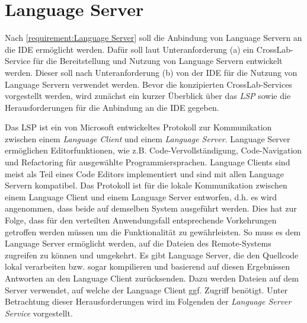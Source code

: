 \section{Language Server}\label{section:konzeption:language-server}

Nach \autoref{requirement:Language Server} soll die Anbindung von Language Servern an die IDE ermöglicht werden. Dafür soll laut Unteranforderung (a) ein CrossLab-Service für die Bereitstellung und Nutzung von Language Servern entwickelt werden. Dieser soll nach Unteranforderung (b) von der IDE für die Nutzung von Language Servern verwendet werden. Bevor die konzipierten CrossLab-Services vorgestellt werden, wird zunächst ein kurzer Überblick über das \textit{\ac{LSP}} \cite{noauthor_language-server-protocol_nodate} sowie die Herausforderungen für die Anbindung an die IDE gegeben.

Das \acl{LSP} ist ein von Microsoft \cite{noauthor_microsoft_nodate} entwickeltes Protokoll zur Kommunikation zwischen einem \textit{Language Client} und einem \textit{Language Server}. Language Server ermöglichen Editorfunktionen, wie z.B. Code-Vervollständigung, Code-Navigation und Refactoring für ausgewählte Programmiersprachen. Language Clients sind meist als Teil eines Code Editors implementiert und sind mit allen Language Servern kompatibel. Das Protokoll ist für die lokale Kommunikation zwischen einem Language Client und einem Language Server entworfen, d.h. es wird angenommen, dass beide auf demselben System ausgeführt werden. Dies hat zur Folge, dass für den verteilten Anwendungsfall entsprechende Vorkehrungen getroffen werden müssen um die Funktionalität zu gewährleisten. So muss es dem Language Server ermöglicht werden, auf die Dateien des Remote-Systems zugreifen zu können und umgekehrt. Es gibt Language Server, die den Quellcode lokal verarbeiten bzw. sogar kompilieren und basierend auf diesen Ergebnissen Antworten an den Language Client zurücksenden. Dazu werden Dateien auf dem Server verwendet, auf welche der Language Client ggf. Zugriff benötigt. Unter Betrachtung dieser Herausforderungen wird im Folgenden der \textit{Language Server Service} vorgestellt.

